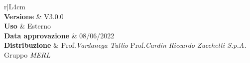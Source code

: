 \begin{center}
	\begin{tabular}{r|L{4cm}}
			 \\
			\hline
			\textbf{Versione}			& V3.0.0 \\
			\textbf{Uso}		& Esterno \\
			\textbf{Data approvazione} 			& 08/06/2022 \\
			\textbf{Distribuzione} 	&	Prof.\textit{Vardanega Tullio} \newline Prof.\textit{Cardin Riccardo} \newline \textit{Zucchetti S.p.A.} \newline Gruppo \textit{MERL} \\
	\end{tabular}
\end{center}
